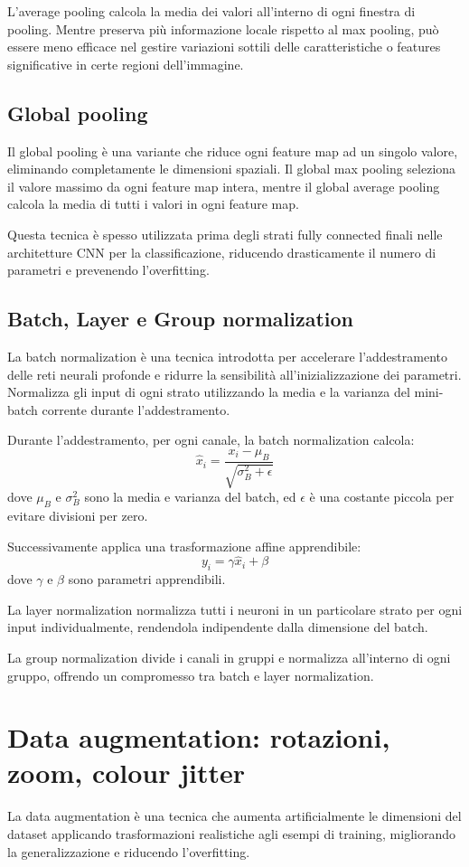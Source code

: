 \documentclass[a4paper,12pt]{report}
\begin{document}
	L'average pooling calcola la media dei valori all'interno di ogni finestra di pooling. Mentre preserva più informazione locale rispetto al max pooling, può essere meno efficace nel gestire variazioni sottili delle caratteristiche o features significative in certe regioni dell'immagine.
	
	\subsection{Global pooling}
	
	Il global pooling è una variante che riduce ogni feature map ad un singolo valore, eliminando completamente le dimensioni spaziali. Il global max pooling seleziona il valore massimo da ogni feature map intera, mentre il global average pooling calcola la media di tutti i valori in ogni feature map.
	
	Questa tecnica è spesso utilizzata prima degli strati fully connected finali nelle architetture CNN per la classificazione, riducendo drasticamente il numero di parametri e prevenendo l'overfitting.
	
	\subsection{Batch, Layer e Group normalization}
	La batch normalization è una tecnica introdotta per accelerare l'addestramento delle reti neurali profonde e ridurre la sensibilità all'inizializzazione dei parametri. Normalizza gli input di ogni strato utilizzando la media e la varianza del mini-batch corrente durante l'addestramento.
	
	Durante l'addestramento, per ogni canale, la batch normalization calcola:
	$$\hat{x}_i = \frac{x_i - \mu_B}{\sqrt{\sigma_B^2 + \epsilon}}$$
	dove $\mu_B$ e $\sigma_B^2$ sono la media e varianza del batch, ed $\epsilon$ è una costante piccola per evitare divisioni per zero.
	
	Successivamente applica una trasformazione affine apprendibile:
	$$y_i = \gamma \hat{x}_i + \beta$$
	dove $\gamma$ e $\beta$ sono parametri apprendibili.
	
	La layer normalization normalizza tutti i neuroni in un particolare strato per ogni input individualmente, rendendola indipendente dalla dimensione del batch.
	
	La group normalization divide i canali in gruppi e normalizza all'interno di ogni gruppo, offrendo un compromesso tra batch e layer normalization.
	
	\section{Data augmentation: rotazioni, zoom, colour jitter}
	La data augmentation è una tecnica che aumenta artificialmente le dimensioni del dataset applicando trasformazioni realistiche agli esempi di training, migliorando la generalizzazione e riducendo l'overfitting.
	
\end{document}

